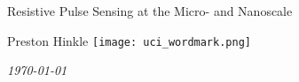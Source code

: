





{
\begin{frame}[c]
 \begin{center}
  

  
  \Huge{
	\textcolor{gray0}{Resistive Pulse Sensing at the Micro- and Nanoscale}
  }
  
  
  \vspace{.25in}
  {\Large 
	\textcolor{gray1}{Preston Hinkle} \hspace{.5in} \texttt{[image: uci\_wordmark.png]}
  }
  
  
  \vspace{.5in}
  {\small
	\textit{\today}
  }
  
  
  
 \end{center}

\end{frame}
}






